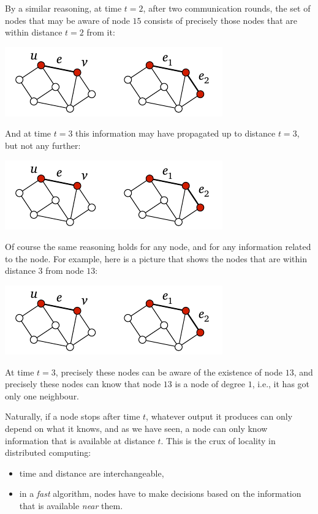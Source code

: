 By a similar reasoning, at time {\boldmath $t = 2$}, after two communication rounds, the set of nodes that may be aware of node $15$ consists of precisely those nodes that are within distance $t = 2$ from it:
\begin{center}
    \includegraphics[page=\PIntroTC]{figs.pdf}
\end{center}
And at time {\boldmath $t = 3$} this information may have propagated up to distance $t = 3$, but not any further:
\begin{center}
    \includegraphics[page=\PIntroTD]{figs.pdf}
\end{center}
\begin{samepage}
Of course the same reasoning holds for any node, and for any information related to the node. For example, here is a picture that shows the nodes that are within distance $3$ from node $13$:
\begin{center}
    \includegraphics[page=\PIntroTDB]{figs.pdf}
\end{center}
\end{samepage}
At time $t = 3$, precisely these nodes can be aware of the existence of node $13$, and precisely these nodes can know that node $13$ is a node of degree $1$, i.e., it has got only one neighbour.

Naturally, if a node stops after time $t$, whatever output it produces can only depend on what it knows, and as we have seen, a node can only know information that is available at distance $t$. This is the crux of locality in distributed computing:
\begin{itemize}
    \item time and distance are interchangeable,
    \item in a \emph{fast} algorithm, nodes have to make decisions based on the information that is available \emph{near} them.
\end{itemize}


